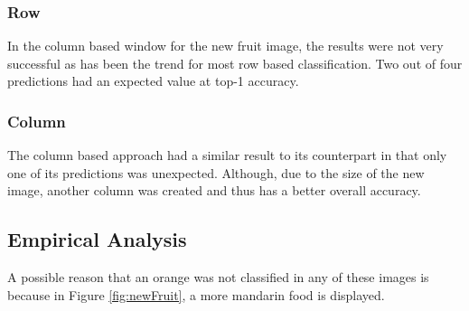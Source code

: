 \subsubsection*{Row}
In the column based window for the new fruit image, the results were not very
successful as has been the trend for most row based classification. Two out of
four predictions had an expected value at top-1 accuracy.

\subsubsection*{Column}
The column based approach had a similar result to its counterpart in that only
one of its predictions was unexpected. Although, due  to the size of the new
image, another column was created and thus has a better overall accuracy.

\subsection*{Empirical Analysis}
A possible reason that an orange was not classified in any of these images is
because in Figure \ref{fig:newFruit}, a more mandarin food is displayed.
